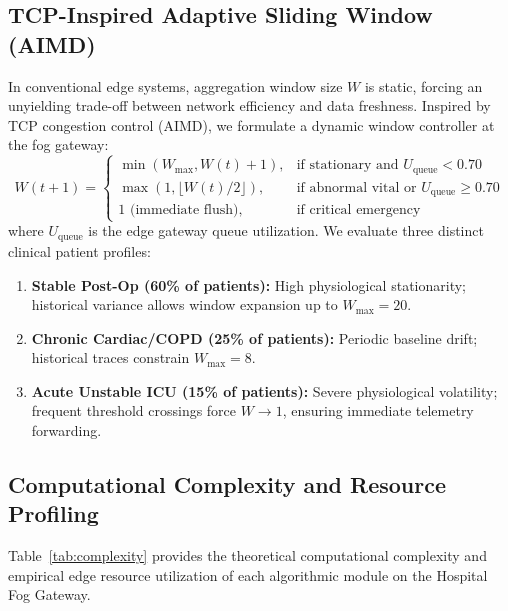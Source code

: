 \documentclass[conference]{IEEEtran}
\begin{document}
\subsection{TCP-Inspired Adaptive Sliding Window (AIMD)}
In conventional edge systems, aggregation window size $W$ is static, forcing an unyielding trade-off between network efficiency and data freshness. Inspired by TCP congestion control (AIMD), we formulate a dynamic window controller at the fog gateway:
\begin{equation}
W(t+1) = 
\begin{cases}
\min\left(W_{\max}, W(t) + 1\right), & \text{if stationary and } U_{\text{queue}} < 0.70 \\
\max\left(1, \lfloor W(t) / 2 \rfloor\right), & \text{if abnormal vital or } U_{\text{queue}} \ge 0.70 \\
1 \text{ (immediate flush)}, & \text{if critical emergency}
\end{cases}
\end{equation}
where $U_{\text{queue}}$ is the edge gateway queue utilization. We evaluate three distinct clinical patient profiles:
\begin{enumerate}
    \item \textbf{Stable Post-Op (60\% of patients):} High physiological stationarity; historical variance allows window expansion up to $W_{\max} = 20$.
    \item \textbf{Chronic Cardiac/COPD (25\% of patients):} Periodic baseline drift; historical traces constrain $W_{\max} = 8$.
    \item \textbf{Acute Unstable ICU (15\% of patients):} Severe physiological volatility; frequent threshold crossings force $W \to 1$, ensuring immediate telemetry forwarding.
\end{enumerate}

\subsection{Computational Complexity and Resource Profiling}
Table~\ref{tab:complexity} provides the theoretical computational complexity and empirical edge resource utilization of each algorithmic module on the Hospital Fog Gateway.
\end{document}
